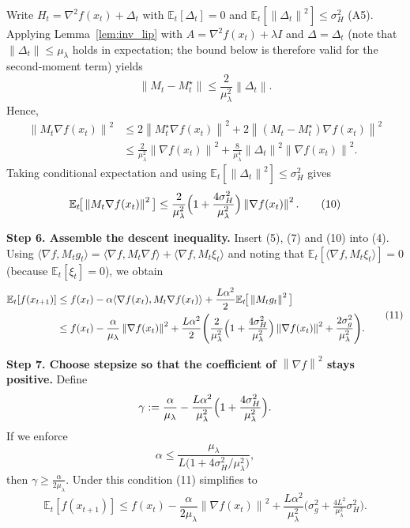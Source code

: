 \documentclass{article}
\newcommand{\E}{\mathbb{E}}
\newcommand{\norm}[1]{\left\|#1\right\|}
\newcommand{\inner}[2]{\langle #1,#2\rangle}
\begin{document}
Write $H_{t}= \nabla^{2}f(x_{t})+\Delta_{t}$ with $\E_{t}[\Delta_{t}]=0$ and
$\E_{t}[\norm{\Delta_{t}}^{2}]\le\sigma_{H}^{2}$ (A5).  
Applying Lemma~\ref{lem:inv_lip} with $A=\nabla^{2}f(x_{t})+\lambda I$ and $\Delta=\Delta_{t}$ (note that $\norm{\Delta_{t}}\le \mu_{\lambda}$ holds in expectation; the bound below is therefore valid for the second‑moment term) yields
\[
\bigl\|M_{t}-M^{\star}_{t}\bigr\|
\le \frac{2}{\mu_{\lambda}^{2}}\norm{\Delta_{t}} . \tag{8}
\]
Hence,
\[
\begin{aligned}
\norm{M_{t}\nabla f(x_{t})}^{2}
&\le 2\norm{M^{\star}_{t}\nabla f(x_{t})}^{2}
   +2\norm{(M_{t}-M^{\star}_{t})\nabla f(x_{t})}^{2} \\
&\le \frac{2}{\mu_{\lambda}^{2}}\norm{\nabla f(x_{t})}^{2}
   +\frac{8}{\mu_{\lambda}^{4}}\norm{\Delta_{t}}^{2}\norm{\nabla f(x_{t})}^{2}. \tag{9}
\end{aligned}
\]
Taking conditional expectation and using $\E_{t}[\norm{\Delta_{t}}^{2}]\le\sigma_{H}^{2}$ gives
\[
\E_{t}\!\big[\norm{M_{t}\nabla f(x_{t})}^{2}\big]
\le \frac{2}{\mu_{\lambda}^{2}}\Bigl(1+\frac{4\sigma_{H}^{2}}{\mu_{\lambda}^{2}}\Bigr)
   \norm{\nabla f(x_{t})}^{2}. \tag{10}
\]

\noindent\textbf{Step 6. Assemble the descent inequality.}  
Insert (5), (7) and (10) into (4). Using $\inner{\nabla f}{M_{t}g_{t}}
= \inner{\nabla f}{M_{t}\nabla f}+\inner{\nabla f}{M_{t}\xi_{t}}$ and noting that
$\E_{t}[\inner{\nabla f}{M_{t}\xi_{t}}]=0$ (because $\E_{t}[\xi_{t}]=0$), we obtain
\[
\begin{aligned}
\E_{t}[f(x_{t+1})]
&\le f(x_{t})
   -\alpha\inner{\nabla f(x_{t})}{M_{t}\nabla f(x_{t})}
   +\frac{L\alpha^{2}}{2}\E_{t}\!\big[\norm{M_{t}g_{t}}^{2}\big] \\
&\le f(x_{t})
   -\frac{\alpha}{\mu_{\lambda}}\norm{\nabla f(x_{t})}^{2}
   +\frac{L\alpha^{2}}{2}\Bigg(
        \frac{2}{\mu_{\lambda}^{2}}\Bigl(1+\frac{4\sigma_{H}^{2}}{\mu_{\lambda}^{2}}\Bigr)
        \norm{\nabla f(x_{t})}^{2}
        +\frac{2\sigma_{g}^{2}}{\mu_{\lambda}^{2}}
      \Bigg) .
\end{aligned}
\tag{11}
\]

\noindent\textbf{Step 7. Choose stepsize so that the coefficient of $\norm{\nabla f}^{2}$ stays positive.}  
Define
\[
\gamma:=\frac{\alpha}{\mu_{\lambda}}
        -\frac{L\alpha^{2}}{\mu_{\lambda}^{2}}
          \Bigl(1+\frac{4\sigma_{H}^{2}}{\mu_{\lambda}^{2}}\Bigr).
\]
If we enforce
\[
\alpha\le \frac{\mu_{\lambda}}{L\bigl(1+4\sigma_{H}^{2}/\mu_{\lambda}^{2}\bigr)},
\tag{12}
\]
then $\gamma\ge \frac{\alpha}{2\mu_{\lambda}}$. Under this condition (11) simplifies to
\[
\E_{t}[f(x_{t+1})]\le f(x_{t})
   -\frac{\alpha}{2\mu_{\lambda}}\norm{\nabla f(x_{t})}^{2}
   +\frac{L\alpha^{2}}{\mu_{\lambda}^{2}}\bigl(\sigma_{g}^{2}+ \tfrac{4L^{2}}{\mu_{\lambda}^{2}}\sigma_{H}^{2}\bigr). \tag{13}
\]
\end{document}
